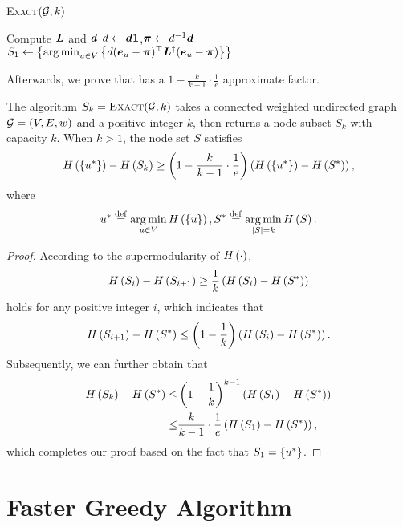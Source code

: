 \documentclass[sigconf]{acmart}
\begin{document}
\begin{algorithm}
  \caption{\textsc{Exact}\((\mathcal{G},k)\)}
  \label{algo:exact}
  Compute \(\boldsymbol{L}\) and \(\boldsymbol{d}\)\;
  \(d\gets\boldsymbol{d}\boldsymbol{1}\),\(\boldsymbol{\pi}\gets d^{-1}\boldsymbol{d}\)\;
  \(S_1\gets\left\{\operatorname*{arg\,min}_{u\in V}\left\{d(\boldsymbol{e}_u-\boldsymbol{\pi})^\top\boldsymbol{L}^\dagger(\boldsymbol{e}_u-\boldsymbol{\pi}) \right\} \right\}\)\;
\end{algorithm}

Afterwards, we prove that  has a \(1-\frac{k}{k-1}\cdot\frac{1}{e}\) approximate factor.
\begin{theorem}
  The algorithm \(S_k=\textsc{Exact}(\mathcal{G},k)\) takes a connected weighted undirected graph \(\mathcal{G}=(V,E,w)\) and a positive integer \(k\), then returns a node subset \(S_k\) with capacity \(k\).
  When \(k>1\), the node set \(S\) satisfies
  \[H\left(\left\{u^* \right\}\right)-H\left(S_k\right)\ge\left( 1-\frac{k}{k-1}\cdot\frac{1}{e} \right)\left( H\left(\left\{u^* \right\}\right)-H\left(S^*\right) \right),\]
  where
  \[u^*\stackrel{\mathrm{def}}{=}\operatorname*{arg\,min}_{u\in V}H\left(\left\{u \right\}\right),S^*\stackrel{\mathrm{def}}{=}\operatorname*{arg\,min}_{\left|S \right|=k}H\left(S\right).\]
\end{theorem}
\begin{proof}
  According to the supermodularity of \(H\left(\cdot\right)\),
  \[H\left(S_i\right)-H\left(S_{i+1}\right)\ge\frac{1}{k}\left( H\left(S_i\right)-H\left(S^*\right) \right)\]
  holds for any positive integer \(i\), which indicates that
  \[H\left(S_{i+1}\right)-H\left(S^*\right)\le\left( 1-\frac{1}{k} \right)\left( H\left(S_i\right)-H\left(S^*\right) \right).\]
  Subsequently, we can further obtain that
  \begin{align*}
    H\left(S_k\right)-H\left(S^*\right)\le & \left( 1-\frac{1}{k} \right)^{k-1}\left( H\left(S_1\right)-H\left(S^*\right) \right)    \\
    \le                      & \frac{k}{k-1}\cdot\frac{1}{e}\left( H\left(S_1\right)-H\left(S^*\right) \right),
  \end{align*}
  which completes our proof based on the fact that \(S_1=\left\{u^* \right\}\).
\end{proof}

\section{Faster Greedy Algorithm}\label{sec:faster-greedy}
\end{document}

